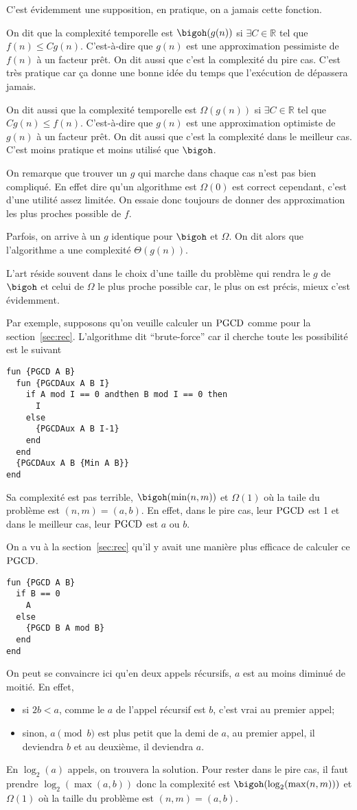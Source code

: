 C'est évidemment une supposition, en pratique,
on a jamais cette fonction.

On dit que la complexité temporelle est $\bigoh(g(n))$ si
$\exists C \in \mathbb{R}$ tel que $f(n) \leq C g(n)$.
C'est-à-dire que $g(n)$ est une approximation pessimiste de $f(n)$
à un facteur prêt.
On dit aussi que c'est la complexité du pire cas.
C'est très pratique car ça donne une bonne idée du temps
que l'exécution de dépassera jamais.

On dit aussi que la complexité temporelle est $\Omega(g(n))$ si
$\exists C \in \mathbb{R}$ tel que $C g(n) \leq f(n)$.
C'est-à-dire que $g(n)$ est une approximation optimiste de $g(n)$
à un facteur prêt.
On dit aussi que c'est la complexité dans le meilleur cas.
C'est moins pratique et moins utilisé que $\bigoh$.

On remarque que trouver un $g$ qui marche dans chaque cas
n'est pas bien compliqué. En effet dire qu'un algorithme est
$\Omega(0)$ est correct cependant, c'est d'une utilité assez limitée.
On essaie donc toujours de donner des approximation les plus proches
possible de $f$.

Parfois, on arrive à un $g$ identique pour $\bigoh$ et $\Omega$.
On dit alors que l'algorithme a une complexité $\Theta(g(n))$.

L'art réside souvent dans le choix d'une taille du problème qui
rendra le $g$ de $\bigoh$ et celui de $\Omega$ le plus proche possible
car, le plus on est précis, mieux c'est évidemment.

Par exemple, supposons qu'on veuille calculer un $\operatorname{PGCD}$
comme pour la section~\ref{sec:rec}.
L'algorithme dit ``brute-force'' car il cherche toute les possibilité
est le suivant
\begin{lstlisting}
fun {PGCD A B}
  fun {PGCDAux A B I}
    if A mod I == 0 andthen B mod I == 0 then
      I
    else
      {PGCDAux A B I-1}
    end
  end
  {PGCDAux A B {Min A B}}
end
\end{lstlisting}
Sa complexité est pas terrible, $\bigoh(\min(n,m))$ et $\Omega(1)$
où la taile du problème est $(n, m) = (a, b)$.
En effet, dans le pire cas, leur $\operatorname{PGCD}$ est 1 et dans le meilleur
cas, leur $\operatorname{PGCD}$ est $a$ ou $b$.

On a vu à la section~\ref{sec:rec} qu'il y avait une manière plus
efficace de calculer ce $\operatorname{PGCD}$.
\begin{lstlisting}
fun {PGCD A B}
  if B == 0
    A
  else
    {PGCD B A mod B}
  end
end
\end{lstlisting}
On peut se convaincre ici qu'en deux appels récursifs,
$a$ est au moins diminué de moitié.
En effet,
\begin{itemize}
  \item si $2b < a$, comme le $a$ de l'appel récursif est $b$, c'est
    vrai au premier appel;
  \item sinon, $a \pmod{b}$ est plus petit que la demi de $a$, au premier
    appel, il deviendra $b$ et au deuxième, il deviendra $a$.
\end{itemize}
En $\log_2(a)$ appels, on trouvera la solution.
Pour rester dans le pire cas, il faut prendre $\log_2(\max(a, b))$
donc la complexité est $\bigoh(\log_2(\max(n, m)))$ et $\Omega(1)$ où
la taille du problème est $(n,m) = (a, b)$.

